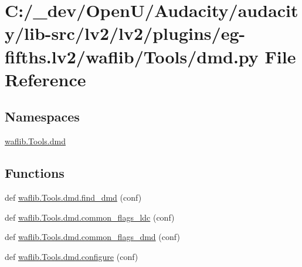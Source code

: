 \hypertarget{lv2_2plugins_2eg-fifths_8lv2_2waflib_2_tools_2dmd_8py}{}\section{C\+:/\+\_\+dev/\+Open\+U/\+Audacity/audacity/lib-\/src/lv2/lv2/plugins/eg-\/fifths.lv2/waflib/\+Tools/dmd.py File Reference}
\label{lv2_2plugins_2eg-fifths_8lv2_2waflib_2_tools_2dmd_8py}
\subsection*{Namespaces}
\begin{DoxyCompactItemize}
\item 
 \hyperlink{namespacewaflib_1_1_tools_1_1dmd}{waflib.\+Tools.\+dmd}
\end{DoxyCompactItemize}
\subsection*{Functions}
\begin{DoxyCompactItemize}
\item 
def \hyperlink{namespacewaflib_1_1_tools_1_1dmd_a4325581bb5714f5478adf1c1c00ca3cd}{waflib.\+Tools.\+dmd.\+find\+\_\+dmd} (conf)
\item 
def \hyperlink{namespacewaflib_1_1_tools_1_1dmd_a491ac92b35c587c124f8738a31c30cd9}{waflib.\+Tools.\+dmd.\+common\+\_\+flags\+\_\+ldc} (conf)
\item 
def \hyperlink{namespacewaflib_1_1_tools_1_1dmd_a418d35f6869615d32f9b91891f3d1d7c}{waflib.\+Tools.\+dmd.\+common\+\_\+flags\+\_\+dmd} (conf)
\item 
def \hyperlink{namespacewaflib_1_1_tools_1_1dmd_a9ba96fbd5fe75ddd056e372285afa6e9}{waflib.\+Tools.\+dmd.\+configure} (conf)
\end{DoxyCompactItemize}
